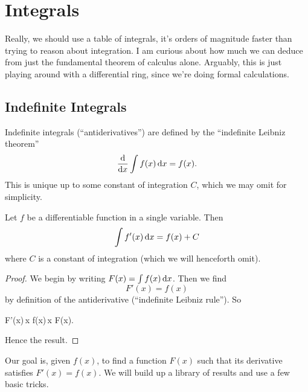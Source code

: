 \chapter{Integrals}

\M
Really, we should use a table of integrals, it's orders of magnitude
faster than trying to reason about integration. I am curious about how
much we can deduce from just the fundamental theorem of calculus alone.
Arguably, this is just playing around with a differential ring, since
we're doing formal calculations.

\section{Indefinite Integrals}

Indefinite integrals (``antiderivatives'') are defined by the
``indefinite Leibniz theorem''
\begin{equation}
\frac{\mathrm{d}}{\mathrm{d} x}\int f(x)\,\mathrm{d} x = f(x).
\end{equation}
This is unique up to some constant of integration $C$, which we may omit
for simplicity.

\begin{theorem}\label{integrals:thm:ftc}
  Let $f$ be a differentiable function in a single variable. Then
  \[ \int f'(x)\,\mathrm{d} x = f(x) + C\]
  where $C$ is a constant of integration (which we will henceforth omit).
\end{theorem}

\begin{proof}
We begin by writing $F(x)=\int f(x)\,\mathrm{d} x$.
Then we find
\begin{equation}\label{eq:integrals:indefinite:ftc:proof-step}
F'(x) = f(x)
\end{equation}
by definition of the antiderivative (``indefinite Leibniz rule'').
So
\begin{calculation}
\int F'(x)\,\D x
\int f(x)\,\D x
F(x).
\end{calculation}
Hence the result.
\end{proof}

\begin{remark}
Our goal is, given $f(x)$, to find a function $F(x)$ such that its
derivative satisfies $F'(x)=f(x)$. We will build up a library of results
and use a few basic tricks.
\end{remark}

